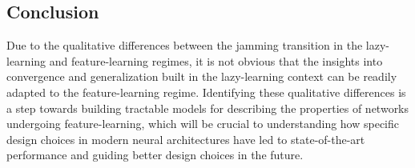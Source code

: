 \documentclass[a4paper, 11pt]{article}
\begin{document}
\subsection{Conclusion}

Due to the qualitative differences between the jamming transition in the lazy-learning and feature-learning regimes, it is not obvious that the insights into convergence and generalization built in the lazy-learning context can be readily adapted to the feature-learning regime. Identifying these qualitative differences is a step towards building tractable models for describing the properties of networks undergoing feature-learning, which will be crucial to understanding how specific design choices in modern neural architectures have led to state-of-the-art performance and guiding better design choices in the future.

\printbibliography
\end{document}
